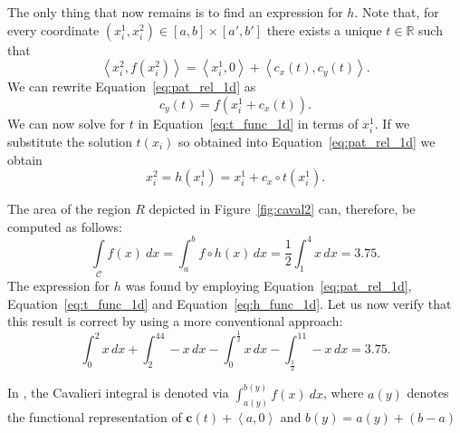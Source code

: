 \documentclass{article}
\theoremstyle{theorem}
\theoremstyle{definition}
\begin{document}
\noindent
The only thing that now remains is to find an expression for $h$. Note that, for every coordinate $(x_i^1,x_i^2) \in [a,b] \times [a',b']$ there exists a unique $t\in\mathbb{R}$ such that
\begin{equation}
 \label{eq:pat_rel_1d}
 \left <x_i^2,f(x_i^2) \right > = \left <x_i^1,0 \right> + \left<c_x(t),c_y(t) \right >.
 \end{equation}
 We can rewrite Equation~\eqref{eq:pat_rel_1d} as
 \begin{equation}
 \label{eq:t_func_1d}
 c_y(t) = f(x_i^1 + c_x(t)).
 \end{equation}
 We can now solve for $t$ in Equation~\eqref{eq:t_func_1d} in terms of $x_i^1$. If we substitute the solution $t(x_i)$ so obtained into Equation~\ref{eq:pat_rel_1d} we obtain 
\begin{equation}
\label{eq:h_func_1d}
 x_i^2 = h(x_i^1) = x_i^1 + c_x\circ t(x_i^1).
\end{equation}

\noindent
The area of the region $R$ depicted in Figure~\ref{fig:caval2} can, therefore, be computed as follows:
\begin{equation}
\int \limits_{\mathcal{C}} f(x)~dx = \int_a^b f \circ h (x)\, dx = \dfrac{1}{2}\int_1^4x\, dx = 3.75.  
\end{equation}
The expression for $h$ was found by employing Equation~\eqref{eq:pat_rel_1d}, Equation~\eqref{eq:t_func_1d} and Equation~\eqref{eq:h_func_1d}. Let us now verify that 
this result is correct by using a more conventional approach:
\begin{equation}
\int_0^2x\, dx+\int_2^44-x\, dx- \int_0^{\frac{1}{2}}x\, dx-\int_{\frac{1}{2}}^11-x\, dx = 3.75. 
\end{equation}

\noindent
In \cite{ackermann12}, the Cavalieri integral is denoted via $\int_{a(y)}^{b(y)} f(x)~dx$, where $a(y)$ denotes the functional representation of $\mathbf{c}(t) + \left <a,0 \right >$ and $b(y) = a(y)+(b-a)$ 

\end{document}
